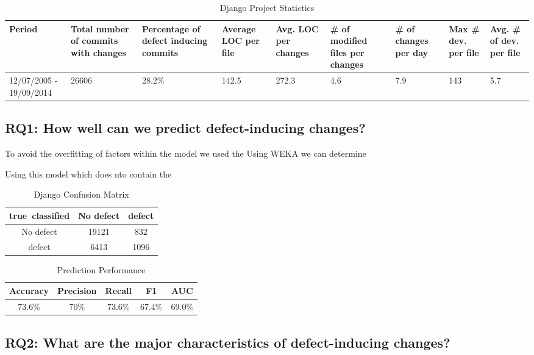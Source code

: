 \documentclass[10pt, conference]{IEEEtran}
\begin{document}
\begin{table}
	\caption{Django Project Statictics}
	\begin{tabular}{|p{2 cm}|p{1.5 cm}|p{1.5 cm}|p{1.5 cm}|p{1.5 cm}|p{1.5 cm}|p{1.5 cm}|p{1.5 cm}|p{1.5 cm}|}
		\hline 
		Period  & Total number of commits with changes  & Percentage of defect inducing commits  & Average LOC per file  & Avg. LOC per changes  & \# of modified files per changes  & \# of changes per day  & Max \# dev. per file  & Avg. \# of dev. per file \tabularnewline
		\hline 
		12/07/2005 - 19/09/2014  & 26606  & 28.2\% & 142.5 & 272.3 & 4.6 & 7.9 & 143 & 5.7 \\ \hline 
	\end{tabular}
	\label{table:statistics}	
\end{table}
\twocolumn

\subsection{RQ1: How well can we predict defect-inducing changes?}
\label{sec:rq1}


To avoid the overfitting of factors within the model we used the Using WEKA we can determine 

Using this model which does nto contain the 
\begin{table}
	\centering
	\caption{Django Confusion Matrix}
	\begin{tabular}{|c|c|c|}
		\hline 
		true\ classified  & No defect  & defect \tabularnewline
		\hline 
		No defect  & 19121  & 832 \tabularnewline
		\hline 
		defect  & 6413  & 1096 \tabularnewline
		\hline 
	\end{tabular}
	\label{table:confusion}
\end{table}

\begin{table}
	\centering
	\caption{Prediction Performance}
	\begin{tabular}{|c|c|c|c|c|}
		\hline Accuracy & Precision & Recall & F1 & AUC\\ 
		\hline 73.6\% & 70\% & 73.6\% & 67.4\% & 69.0\% \\ 
		\hline 
	\end{tabular}
	
	\label{table:prediction} 
\end{table}


\subsection{RQ2: What are the major characteristics of defect-inducing changes?}
\label{sec:rq2}
\end{document}
